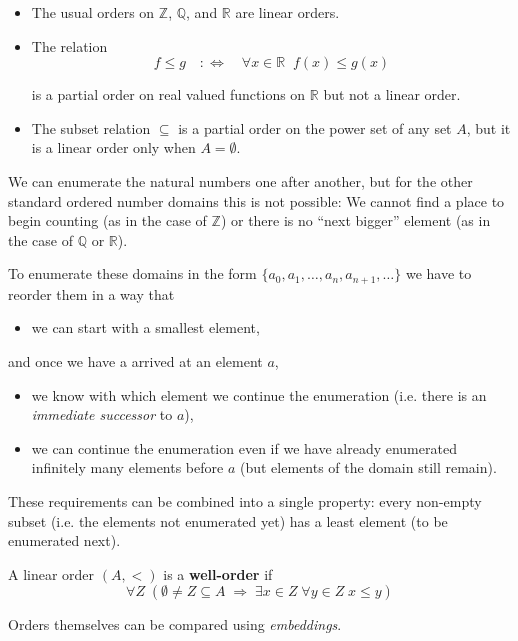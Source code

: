 \begin{example}\begin{itemize}
\item The usual orders on $\mathbb{Z}$, $\mathbb{Q}$, and $\mathbb{R}$ are linear orders.
\item The relation
\begin{equation}

f \leq g \quad : \iff \quad \forall x \in \mathbb{R} \;\; f(x) \leq g(x)
\end{equation}


is a partial order on real valued functions on $\mathbb{R}$ but not a linear order.
\item The subset relation $\subseteq$ is a partial order on the power set of any set $A$, but it is a linear order only when $A = \emptyset$.
\end{itemize}

\end{example}We can enumerate the natural numbers one after another, but for the other standard ordered number domains this is not possible: We cannot find a place to begin counting (as in the case of $\mathbb{Z}$) or there is no ``next bigger'' element (as in the case of $\mathbb{Q}$ or $\mathbb{R}$).

To enumerate these domains in the form $\{a_0, a_1,\ldots, a_n, a_{n+1}, \ldots \}$ we have to reorder them in a way that

\begin{itemize}
\item we can start with a smallest element,
\end{itemize}

and once we have a arrived at an element $a$,

\begin{itemize}
\item we know with which element we continue the enumeration (i.e. there is an \textit{immediate successor} to $a$),
\item we can continue the enumeration even if we have already enumerated infinitely many elements before $a$ (but elements of the domain still remain).
\end{itemize}

These requirements can be combined into a single property: every non-empty subset (i.e. the elements not enumerated yet) has a least element (to be enumerated next).

\begin{definition}A linear order $(A,<)$ is a \textbf{well-order} if
\begin{equation}

\forall Z \; (\emptyset \ne Z \subseteq A \; \Rightarrow \; \exists x \in Z \; \forall y \in Z \;  x \leq y)
\end{equation}

\end{definition}Orders themselves can be compared using \textit{embeddings}.

